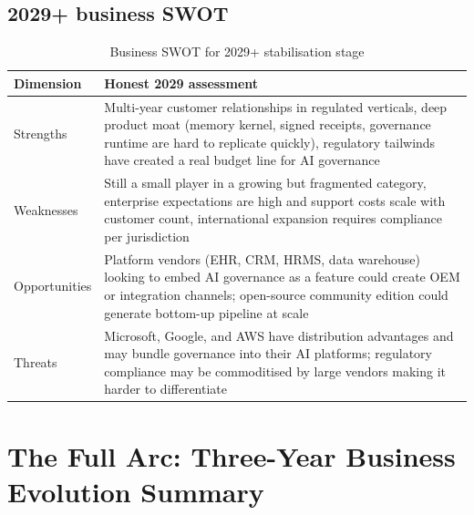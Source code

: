 \subsection{2029+ business SWOT}

\begin{table}[H]
\centering
\renewcommand{\arraystretch}{1.45}
\begin{tabularx}{\textwidth}{@{}lX@{}}
\toprule
\textbf{Dimension} & \textbf{Honest 2029 assessment} \\
\midrule
Strengths & Multi-year customer relationships in regulated verticals, deep product moat (memory kernel, signed receipts, governance runtime are hard to replicate quickly), regulatory tailwinds have created a real budget line for AI governance \\
Weaknesses & Still a small player in a growing but fragmented category, enterprise expectations are high and support costs scale with customer count, international expansion requires compliance per jurisdiction \\
Opportunities & Platform vendors (EHR, CRM, HRMS, data warehouse) looking to embed AI governance as a feature could create OEM or integration channels; open-source community edition could generate bottom-up pipeline at scale \\
Threats & Microsoft, Google, and AWS have distribution advantages and may bundle governance into their AI platforms; regulatory compliance may be commoditised by large vendors making it harder to differentiate \\
\bottomrule
\end{tabularx}
\caption{Business SWOT for 2029+ stabilisation stage}
\end{table}

\section{The Full Arc: Three-Year Business Evolution Summary}

